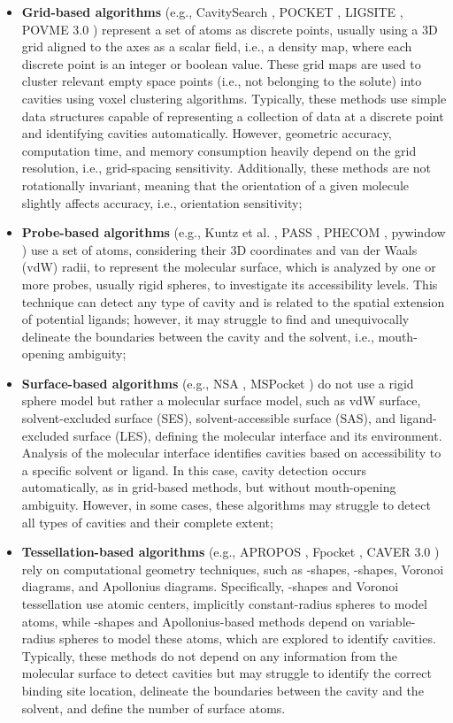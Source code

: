 \documentclass[Ingles]{phdthesis}
\def\ie{i.e.\onedot}
\def\eg{e.g.\onedot}
\begin{document}
\begin{itemize}
  \item \textbf{Grid-based algorithms} (\eg, CavitySearch \cite{cavitysearch}, POCKET \cite{pocket}, LIGSITE \cite{ligsite}, POVME 3.0 \cite{povme}) represent a set of atoms as discrete points, usually using a 3D grid aligned to the axes as a scalar field, \ie, a density map, where each discrete point is an integer or boolean value. These grid maps are used to cluster relevant empty space points (\ie, not belonging to the solute) into cavities using voxel clustering algorithms. Typically, these methods use simple data structures capable of representing a collection of data at a discrete point and identifying cavities automatically. However, geometric accuracy, computation time, and memory consumption heavily depend on the grid resolution, \ie, grid-spacing sensitivity. Additionally, these methods are not rotationally invariant, meaning that the orientation of a given molecule slightly affects accuracy, \ie, orientation sensitivity;
  \item \textbf{Probe-based algorithms} (\eg, Kuntz et al. \cite{kuntz1982}, PASS \cite{pass}, PHECOM \cite{phecom}, pywindow \cite{pywindow}) use a set of atoms, considering their 3D coordinates and van der Waals (vdW) radii, to represent the molecular surface, which is analyzed by one or more probes, usually rigid spheres, to investigate its accessibility levels. This technique can detect any type of cavity and is related to the spatial extension of potential ligands; however, it may struggle to find and unequivocally delineate the boundaries between the cavity and the solvent, \ie, mouth-opening ambiguity;
  \item \textbf{Surface-based algorithms} (\eg, NSA \cite{nsa}, MSPocket \cite{mspocket}) do not use a rigid sphere model but rather a molecular surface model, such as vdW surface, solvent-excluded surface (SES), solvent-accessible surface (SAS), and ligand-excluded surface (LES), defining the molecular interface and its environment. Analysis of the molecular interface identifies cavities based on accessibility to a specific solvent or ligand. In this case, cavity detection occurs automatically, as in grid-based methods, but without mouth-opening ambiguity. However, in some cases, these algorithms may struggle to detect all types of cavities and their complete extent;
  \item \textbf{Tessellation-based algorithms} (\eg, APROPOS \cite{apropos}, Fpocket \cite{fpocket}, CAVER 3.0 \cite{caver3}) rely on computational geometry techniques, such as \textalpha-shapes, \textbeta-shapes, Voronoi diagrams, and Apollonius diagrams. Specifically, \textalpha-shapes and Voronoi tessellation use atomic centers, implicitly constant-radius spheres to model atoms, while \textbeta-shapes and Apollonius-based methods depend on variable-radius spheres to model these atoms, which are explored to identify cavities. Typically, these methods do not depend on any information from the molecular surface to detect cavities but may struggle to identify the correct binding site location, delineate the boundaries between the cavity and the solvent, and define the number of surface atoms.
\end{itemize}
\end{document}
